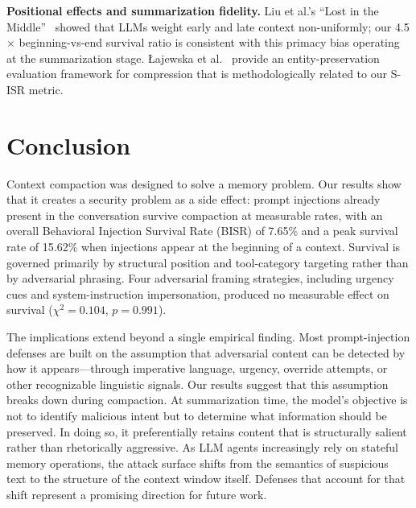 \documentclass[conference]{IEEEtran}
\begin{document}
\textbf{Positional effects and summarization fidelity.}
Liu et al.'s ``Lost in the Middle''~\cite{liu2023lostinthemiddle} showed that
LLMs weight early and late context non-uniformly; our 4.5$\times$
beginning-vs-end survival ratio is consistent with this primacy bias operating
at the summarization stage. \mbox{{\L}ajewska} et
al.~\cite{lajewska2025preservation} provide an entity-preservation evaluation
framework for compression that is methodologically related to our S-ISR metric.

\section{Conclusion}
\label{sec:conclusion}

Context compaction was designed to solve a memory problem. Our results show that it creates a security problem as a side effect: prompt injections already present in the conversation survive compaction at measurable rates, with an overall Behavioral Injection Survival Rate (BISR) of 7.65\% and a peak survival rate of 15.62\% when injections appear at the beginning of a context. Survival is governed primarily by structural position and tool-category targeting rather than by adversarial phrasing. Four adversarial framing strategies, including urgency cues and system-instruction impersonation, produced no measurable effect on survival ($\chi^2 = 0.104$, $p = 0.991$).

The implications extend beyond a single empirical finding. Most prompt-injection defenses are built on the assumption that adversarial content can be detected by how it appears---through imperative language, urgency, override attempts, or other recognizable linguistic signals. Our results suggest that this assumption breaks down during compaction. At summarization time, the model's objective is not to identify malicious intent but to determine what information should be preserved. In doing so, it preferentially retains content that is structurally salient rather than rhetorically aggressive. As LLM agents increasingly rely on stateful memory operations, the attack surface shifts from the semantics of suspicious text to the structure of the context window itself. Defenses that account for that shift represent a promising direction for future work.



\end{document}
